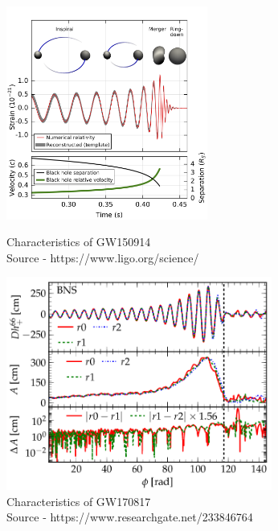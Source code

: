 \begin{figure}[h]
   \begin{minipage}{0.6\textwidth}
     \centering
     \includegraphics[height = 7cm , width = 4 cm]{images.tex/GW150914.png}
     \caption{Characteristics of GW150914\\ Source - https://www.ligo.org/science/}
   \end{minipage}\hfill
   \begin{minipage}{0.6\textwidth}
     \centering
     \includegraphics[height = 7cm ,width = 8 cm]{images.tex/GW170817.png}
     \caption{Characteristics of GW170817\\ Source - https://www.researchgate.net/233846764}
   \end{minipage}
\end{figure}
